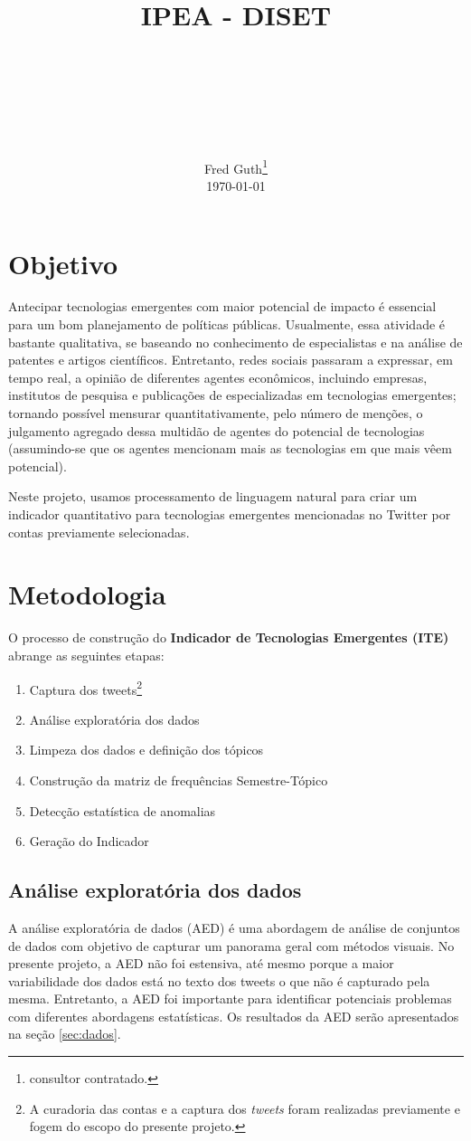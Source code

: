 \documentclass[paper=a4, fontsize=11pt]{scrartcl}
\title{
		\usefont{OT1}{bch}{b}{n}
		\normalfont \normalsize \textsc{IPEA - DISET} \\ [25pt]
		\horrule{0.5pt} \\[0.4cm]
		\huge \projectname \\
		\horrule{2pt} \\[0.5cm]
}
\author{
		\normalfont 								\normalsize
        Fred Guth\footnote{consultor contratado.}\\[-3pt]		\normalsize
        \today
}
\date{}
\numberwithin{equation}{section}		%
\numberwithin{figure}{section}			%
\numberwithin{table}{section}				%
\begin{document}
\maketitle
\thispagestyle{empty}
\section{Objetivo}
Antecipar tecnologias emergentes com maior potencial de impacto é essencial para um bom planejamento de políticas públicas.  Usualmente, essa atividade é bastante qualitativa, se baseando no conhecimento de especialistas e na análise de patentes e artigos científicos. Entretanto, redes sociais passaram a expressar, em tempo real, a opinião de diferentes agentes econômicos, incluindo empresas, institutos de pesquisa e publicações de especializadas em tecnologias emergentes; tornando possível mensurar quantitativamente, pelo número de menções, o julgamento agregado dessa multidão de agentes do potencial de tecnologias (assumindo-se que os agentes mencionam mais as tecnologias em que mais vêem potencial).

Neste projeto, usamos processamento de linguagem natural para criar um indicador quantitativo para tecnologias emergentes mencionadas no Twitter por contas previamente selecionadas.

\section{Metodologia}
O processo de construção do \textbf{Indicador de Tecnologias Emergentes (ITE)} abrange as seguintes etapas:
\begin{enumerate}
	\item Captura dos tweets\footnote{A curadoria das contas e a captura dos \emph{tweets} foram realizadas previamente e fogem do escopo do presente projeto.}
	\item Análise exploratória dos dados
	\item Limpeza dos dados e definição dos tópicos
	\item Construção da matriz de frequências Semestre-Tópico
	\item Detecção estatística de anomalias
	\item Geração do Indicador
\end{enumerate}
\subsection{Análise exploratória dos dados}
A análise exploratória de dados (AED) é uma abordagem de análise de conjuntos de dados com objetivo de capturar um panorama geral com métodos visuais. No presente projeto, a AED não foi estensiva, até mesmo porque a maior variabilidade dos dados está no texto dos tweets o que não é capturado pela mesma. Entretanto, a AED foi importante para identificar potenciais problemas com diferentes abordagens estatísticas. Os resultados da AED serão apresentados na seção \ref{sec:dados}.
\end{document}
